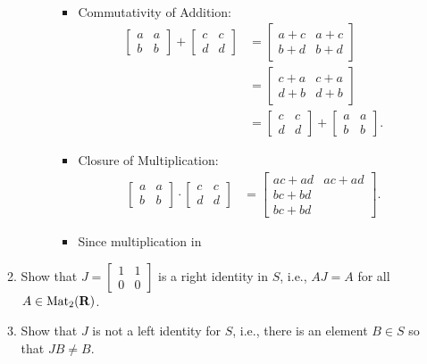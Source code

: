 \documentclass[11pt]{article}
\begin{document}
\begin{enumerate}
\begin{enumerate}
\begin{description}
\begin{itemize}
\begin{align*}
          \end{align*}
        \item Commutativity of Addition:
          \begin{align*}
            \begin{bmatrix}a&a\\b&b\end{bmatrix} + \begin{bmatrix}c&c\\d&d\end{bmatrix} &= \begin{bmatrix}a+c&a+c\\b+d&b+d\end{bmatrix}\\
                            &= \begin{bmatrix}c+a&c+a\\d+b&d+b\end{bmatrix}\\
                            &= \begin{bmatrix}c&c\\d&d\end{bmatrix} + \begin{bmatrix}a&a\\b&b\end{bmatrix}.
          \end{align*}
        \item Closure of Multiplication:
          \begin{align*}
            \begin{bmatrix}a&a\\b&b\end{bmatrix}\cdot \begin{bmatrix}c&c\\d&d\end{bmatrix} &= \begin{bmatrix}ac+ad & ac+ad\\bc+bd\\bc+bd\end{bmatrix}.
          \end{align*}
        \item Since multiplication in
      \end{itemize}
  \end{description}
\item Show that $J = \begin{bmatrix} 1 & 1 \\ 0 & 0 \end{bmatrix}$ is a right identity in $S$, i.e., $AJ = A$ for all $A \in \operatorname{Mat}_2(\mathbf{R})$. 
\item Show that $J$ is not a left identity for $S$, i.e., there is an element $B \in S$ so that $JB \neq B$. 
\end{enumerate}


\end{enumerate}
\end{document}
